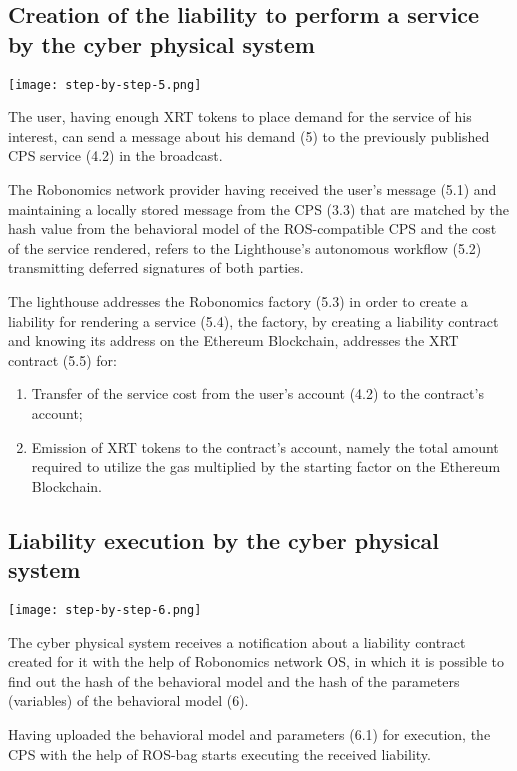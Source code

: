 \documentclass{article}
\begin{document}
\subsection{Creation of the liability to perform a service by the cyber physical system}

\texttt{[image: step-by-step-5.png]} 

The user, having enough XRT tokens to place demand for the service of his interest, can send a message about his demand (5) to the previously published CPS service (4.2) in the broadcast.

The Robonomics network provider having received the user's message (5.1) and maintaining a locally stored message from the CPS (3.3) that are matched by the hash value from the behavioral model of the ROS-compatible CPS and the cost of the service rendered, refers to the Lighthouse's autonomous workflow (5.2) transmitting deferred signatures of both parties.

The lighthouse addresses the Robonomics factory (5.3) in order to create a liability for rendering a service (5.4), the factory, by creating a liability contract and knowing its address on the Ethereum Blockchain, addresses the XRT contract  (5.5) for:
\begin{enumerate}
	\item Transfer of the service cost from the user's account (4.2) to the contract's account;
	\item Emission of XRT tokens to the contract's account, namely the total amount required to utilize the gas multiplied by the starting factor on the Ethereum Blockchain.
\end{enumerate}

\subsection{Liability execution by the cyber physical system}

\texttt{[image: step-by-step-6.png]} 

The cyber physical system receives a notification about a liability contract created for it with the help of Robonomics network OS, in which it is possible to find out the hash of the behavioral model and the hash of the parameters (variables) of the behavioral model (6).

Having uploaded the behavioral model and parameters (6.1) for execution, the CPS with the help of ROS-bag starts executing the received liability.
\end{document}
